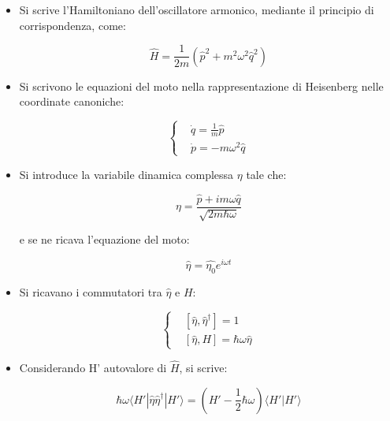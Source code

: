 \documentclass{article}
\begin{document}
\begin{itemize}
  \item Si scrive l'Hamiltoniano dell'oscillatore armonico, mediante il principio di corrispondenza, come:

        \begin{equation}
          \hat{H}=\frac{1}{2m}(\hat{p}^2+m^2\omega^2\hat{q}^2)
        \end{equation}
  \item Si scrivono le equazioni del moto nella rappresentazione di Heisenberg nelle coordinate canoniche:

        \begin{equation}
          \left\{
          \begin{aligned}
             & \dot{q}=\frac{1}{m}\hat{p} \\
             & \dot{p}=-m\omega^2\hat{q}
          \end{aligned}
          \right.
        \end{equation}

  \item Si introduce la variabile dinamica complessa $\eta$ tale che:

        \begin{equation}
          \eta= \frac{\hat{p}+im\omega \hat{q}}{\sqrt{2m\hbar \omega}}
        \end{equation}

        e se ne ricava l'equazione del moto:

        \begin{equation}
          \hat{\eta}=\hat{\eta_0} e^{i\omega t}
        \end{equation}

  \item Si ricavano i commutatori tra $\hat{\eta}$ e $H$:

        \begin{equation}
          \left\{
          \begin{aligned}
             & [\hat{\eta},\hat{\eta}^{\dagger}]=1    \\
             & [\hat{\eta},H]=\hbar \omega \hat{\eta}
          \end{aligned}
          \right.
        \end{equation}

  \item Considerando H' autovalore di $\hat{H}$, si scrive:

        \begin{equation}
          \hbar \omega\langle H' |\hat{\eta}\hat{\eta}^{\dagger}|H'\rangle =(H'-\frac{1}{2}\hbar \omega)\langle H' |H'\rangle
        \end{equation}


\end{itemize}
\end{document}
